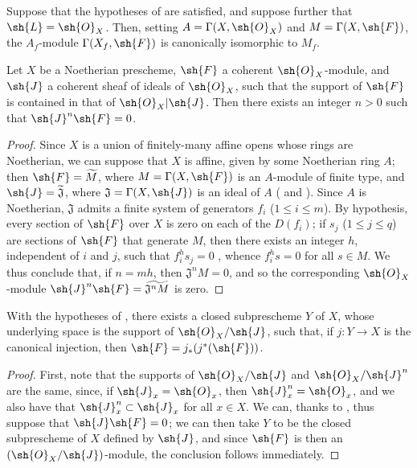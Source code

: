 \begin{corollary}[9.3.3]
\label{I.9.3.3}
Suppose that the hypotheses of  are satisfied, and suppose further that
$\sh{L}=\sh{O}_X$. Then, setting $A=\Gamma(X,\sh{O}_X)$ and $M=\Gamma(X,\sh{F})$, the $A_f$-module
$\Gamma(X_f,\sh{F})$ is canonically isomorphic to $M_f$.
\end{corollary}

\begin{proposition}[9.3.4]
\label{I.9.3.4}
Let $X$ be a Noetherian prescheme, $\sh{F}$ a coherent $\sh{O}_X$-module, and $\sh{J}$ a
coherent sheaf of ideals of $\sh{O}_X$, such that the support of $\sh{F}$ is contained in that
of $\sh{O}_X|\sh{J}$. Then there exists an integer $n>0$ such that $\sh{J}^n\sh{F}=0$.
\end{proposition}

\begin{proof}
Since $X$ is a union of finitely-many affine opens whose rings are Noetherian, we can suppose
that $X$ is affine, given by some Noetherian ring $A$; then $\sh{F}=\widetilde{M}$, where
$M=\Gamma(X,\sh{F})$ is an $A$-module of finite type, and $\sh{J}=\widetilde{\mathfrak{J}}$,
where $\mathfrak{J}=\Gamma(X,\sh{J})$ is an ideal of $A$ ( and
). Since $A$ is Noetherian, $\mathfrak{J}$ admits a finite system of
generators $f_i$ ($1\leq i\leq m$). By hypothesis, every section of $\sh{F}$ over
$X$ is zero on each of the $D(f_i)$; if $s_j$ ($1\leq j\leq q$) are sections of
$\sh{F}$ that generate $M$, then there exists an integer $h$, independent of $i$ and $j$,
such that $f_i^h s_j=0$ , whence $f_i^h s=0$ for all $s\in M$. We thus
conclude that, if $n=mh$, then $\mathfrak{J}^n M=0$, and so the corresponding $\sh{O}_X$-module
$\sh{J}^n\sh{F}=\widetilde{\mathfrak{J}^n M}$  is zero.
\end{proof}

\begin{corollary}[9.3.5]
\label{I.9.3.5}
With the hypotheses of , there exists a closed subprescheme $Y$ of $X$,
whose underlying space is the support of $\sh{O}_X/\sh{J}$, such that, if $j:Y\to X$ is the
canonical injection, then $\sh{F}=j_*(j^*(\sh{F}))$.
\end{corollary}

\begin{proof}
First, note that the supports of $\sh{O}_X/\sh{J}$ and $\sh{O}_X/\sh{J}^n$ are the same,
since, if $\sh{J}_x=\sh{O}_x$, then $\sh{J}_x^n=\sh{O}_x$, and we also have that
$\sh{J}_x^n\subset\sh{J}_x$ for all $x\in X$. We can, thanks to , thus
suppose that $\sh{J}\sh{F}=0$; we can then take $Y$ to be the closed subprescheme of $X$
defined by $\sh{J}$, and since $\sh{F}$ is then an $(\sh{O}_X/\sh{J})$-module, the conclusion
follows immediately.
\end{proof}

